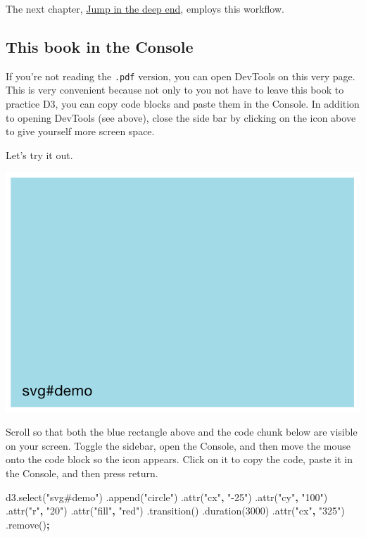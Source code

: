\documentclass[openany]{book}
\newenvironment{Shaded}{\begin{snugshade}}{\end{snugshade}}
\newcommand{\AttributeTok}[1]{\textcolor[rgb]{0.77,0.63,0.00}{#1}}
\newcommand{\DecValTok}[1]{\textcolor[rgb]{0.00,0.00,0.81}{#1}}
\newcommand{\NormalTok}[1]{#1}
\newcommand{\OperatorTok}[1]{\textcolor[rgb]{0.81,0.36,0.00}{\textbf{#1}}}
\newcommand{\StringTok}[1]{\textcolor[rgb]{0.31,0.60,0.02}{#1}}
\newcommand{\VariableTok}[1]{\textcolor[rgb]{0.00,0.00,0.00}{#1}}
\begin{document}
The next chapter, \href{jump.html}{Jump in the deep end}, employs this workflow.

\hypertarget{this-book-in-the-console}{%
\subsection{This book in the Console}\label{this-book-in-the-console}}

If you're not reading the \texttt{.pdf} version, you can open DevTools on this very page. This is very convenient because not only to you not have to leave this book to practice D3, you can copy code blocks and paste them in the Console. In addition to opening DevTools (see above), close the side bar by clicking on the icon above to give yourself more screen space.

Let's try it out.

\includegraphics[width=0.33\linewidth]{images/pdfbook/svg1}

Scroll so that both the blue rectangle above and the code chunk below are visible on your screen. Toggle the sidebar, open the Console, and then move the mouse onto the code block so the icon appears. Click on it to copy the code, paste it in the Console, and then press return.

\begin{Shaded}
\begin{Highlighting}[]
\VariableTok{d3}\NormalTok{.}\AttributeTok{select}\NormalTok{(}\StringTok{"svg#demo"}\NormalTok{)}
\NormalTok{  .}\AttributeTok{append}\NormalTok{(}\StringTok{"circle"}\NormalTok{)}
\NormalTok{    .}\AttributeTok{attr}\NormalTok{(}\StringTok{"cx"}\OperatorTok{,} \StringTok{"-25"}\NormalTok{)              }
\NormalTok{    .}\AttributeTok{attr}\NormalTok{(}\StringTok{"cy"}\OperatorTok{,} \StringTok{"100"}\NormalTok{)}
\NormalTok{    .}\AttributeTok{attr}\NormalTok{(}\StringTok{"r"}\OperatorTok{,} \StringTok{"20"}\NormalTok{)}
\NormalTok{    .}\AttributeTok{attr}\NormalTok{(}\StringTok{"fill"}\OperatorTok{,} \StringTok{"red"}\NormalTok{)}
\NormalTok{  .}\AttributeTok{transition}\NormalTok{()}
\NormalTok{  .}\AttributeTok{duration}\NormalTok{(}\DecValTok{3000}\NormalTok{)}
\NormalTok{    .}\AttributeTok{attr}\NormalTok{(}\StringTok{"cx"}\OperatorTok{,} \StringTok{"325"}\NormalTok{)}
\NormalTok{  .}\AttributeTok{remove}\NormalTok{()}\OperatorTok{;}
\end{Highlighting}
\end{Shaded}
\end{document}
